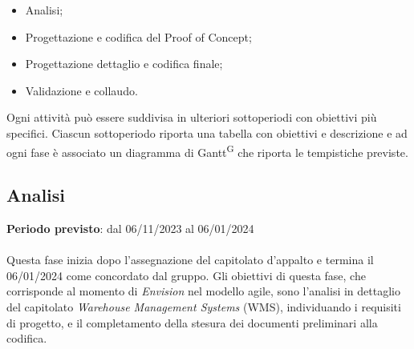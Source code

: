 \begin{itemize}
    \item Analisi;
    \item Progettazione e codifica del Proof of Concept;
    \item Progettazione dettaglio e codifica finale;
    \item Validazione e collaudo.
\end{itemize}

Ogni attività può essere suddivisa in ulteriori sottoperiodi con obiettivi più specifici. Ciascun sottoperiodo riporta una tabella con obiettivi e descrizione e ad ogni fase è associato un diagramma di Gantt\textsuperscript{G} che riporta le tempistiche previste.

\subsection{Analisi}\label{sec:pianificazione:analisi}

\textbf{Periodo previsto}: dal 06/11/2023 al 06/01/2024\\\\
Questa fase inizia dopo l'assegnazione del capitolato d'appalto e termina il 06/01/2024 come concordato dal gruppo. Gli obiettivi di questa fase, che corrisponde al momento di \textit{Envision} nel modello agile, sono l'analisi in dettaglio del capitolato \textit{Warehouse Management Systems} (WMS), individuando i requisiti di progetto, e il completamento della stesura dei documenti preliminari alla codifica.

